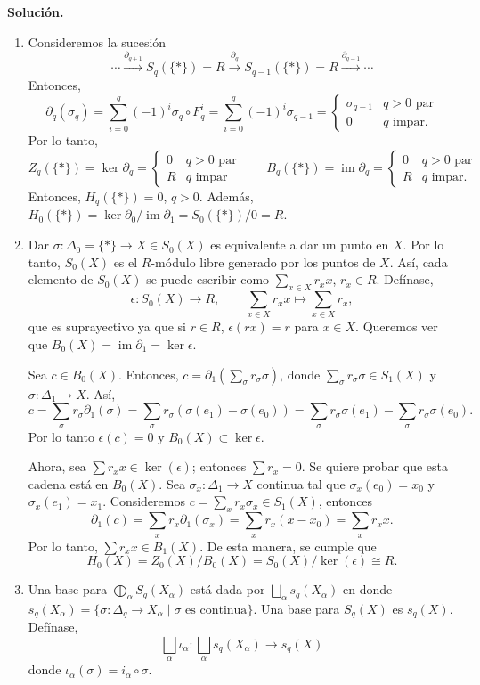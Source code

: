 \documentclass[11pt,a4paper]{article}
\theoremstyle{plain}
\theoremstyle{definition}
\theoremstyle{remark}
\DeclareMathOperator{\im}{im}
\begin{document}
\begin{enumerate}[label=\arabic*.,leftmargin=*]
\noindent\textbf{Solución.}
\begin{enumerate}[label=\alph*)]
\item Consideremos la sucesión
\[
\cdots\xrightarrow{\partial_{q+1}}S_q(\{*\})=R\xrightarrow{\partial_q}S_{q-1}(\{*\})=R\xrightarrow{\partial_{q-1}}\cdots
\]
Entonces,
\[
\partial_q(\sigma_q)=\sum_{i=0}^q(-1)^i\sigma_q\circ F_q^i=\sum_{i=0}^q(-1)^i\sigma_{q-1}
=\begin{cases}\sigma_{q-1} & q>0\text{ par}\\0 & q\text{ impar.}\end{cases}
\]
Por lo tanto,
\[
Z_q(\{*\})=\ker\partial_q=\begin{cases}0 & q>0\text{ par}\\R & q\text{ impar}\end{cases}
\qquad
B_q(\{*\})=\im\partial_q=\begin{cases}0 & q>0\text{ par}\\R & q\text{ impar.}\end{cases}
\]
Entonces, $H_q(\{*\})=0$, $q>0$. Además,
$H_0(\{*\})=\ker\partial_0/\im\partial_1=S_0(\{*\})/0=R$.
\item Dar $\sigma:\Delta_0=\{*\}\to X\in S_0(X)$ es equivalente a dar un
punto en $X$. Por lo tanto, $S_0(X)$ es el $R$-módulo libre generado por
los puntos de $X$. Así, cada elemento de $S_0(X)$ se puede escribir como
$\sum_{x\in X}r_xx$, $r_x\in R$. Defínase,
\[
\epsilon:S_0(X)\to R, \qquad \sum_{x\in X}r_xx\mapsto\sum_{x\in X}r_x,
\]
que es suprayectivo ya que si $r\in R$, $\epsilon(rx)=r$ para $x\in X$.
Queremos ver que $B_0(X)=\im\partial_1=\ker\epsilon$.

Sea $c\in B_0(X)$. Entonces, $c=\partial_1\left(\sum_\sigma r_\sigma\sigma\right)$,
donde $\sum_\sigma r_\sigma\sigma\in S_1(X)$ y $\sigma:\Delta_1\to X$. Así,
\[
c=\sum_\sigma r_\sigma\partial_1(\sigma)=\sum_\sigma r_\sigma(\sigma(e_1)-\sigma(e_0))
=\sum_\sigma r_\sigma\sigma(e_1)-\sum_\sigma r_\sigma\sigma(e_0).
\]
Por lo tanto $\epsilon(c)=0$ y $B_0(X)\subset\ker\epsilon$.

Ahora, sea $\sum r_xx\in\ker(\epsilon)$; entonces $\sum r_x=0$. Se quiere
probar que esta cadena está en $B_0(X)$. Sea $\sigma_x:\Delta_1\to X$
continua tal que $\sigma_x(e_0)=x_0$ y $\sigma_x(e_1)=x_1$. Consideremos
$c=\sum_xr_x\sigma_x\in S_1(X)$, entonces
\[
\partial_1(c)=\sum_xr_x\partial_1(\sigma_x)=\sum_xr_x(x-x_0)=\sum_xr_xx.
\]
Por lo tanto, $\sum r_xx\in B_1(X)$. De esta manera, se cumple que
\[
H_0(X)=Z_0(X)/B_0(X)=S_0(X)/\ker(\epsilon)\cong R.
\]
\item Una base para $\bigoplus_\alpha S_q(X_\alpha)$ está dada por
$\bigsqcup_\alpha s_q(X_\alpha)$ en donde
$s_q(X_\alpha)=\{\sigma:\Delta_q\to X_\alpha\mid\sigma\text{ es continua}\}$.
Una base para $S_q(X)$ es $s_q(X)$. Defínase,
\[
\bigsqcup_\alpha\iota_\alpha:\bigsqcup_\alpha s_q(X_\alpha)\to s_q(X)
\]
donde $\iota_\alpha(\sigma)=i_\alpha\circ\sigma$.


\end{enumerate}
\end{enumerate}
\end{document}
